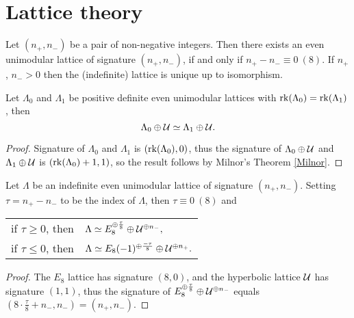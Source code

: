 \section{Lattice theory}

\begin{theorem}[Milnor]
    \label{Milnor}
    Let $(n_+,n_-)$ be a pair of non-negative integers. Then there exists an even unimodular lattice of signature $(n_+, n_-)$, if and only if $n_+ - n_- \equiv 0 \ (8)$. If $n_+$, $n_- > 0$ then the (indefinite) lattice is unique up to isomorphism.
\end{theorem}

\begin{corollary}
    Let $\Lambda_0$ and $\Lambda_1$ be positive definite even unimodular lattices with $\operatorname{rk}(\Lambda_0) = \operatorname{rk}(\Lambda_1)$, then
    \[
        \Lambda_0 \oplus \mathcal U \simeq \Lambda_1 \oplus \mathcal U.
    \]
\end{corollary}

\begin{proof}
    Signature of $\Lambda_0$ and $\Lambda_1$ is $(\operatorname{rk}(\Lambda_0), 0)$, thus the signature of $\Lambda_0 \oplus \mathcal U$ and $\Lambda_1 \oplus \mathcal U$ is $(\operatorname{rk}(\Lambda_0) + 1, 1)$, so the result follows by Milnor's Theorem \ref{Milnor}.
\end{proof}

\begin{corollary}
    Let $\Lambda$ be an indefinite even unimodular lattice of signature $(n_+, n_-)$. Setting $\tau = n_+ - n_-$ to be the index of $\Lambda$, then $\tau \equiv 0 \ (8)$ and
    \begin{center}
        \begin{tabular}{r l}
            if $\tau \geq 0$, then & $\Lambda \simeq E_8^{\oplus \frac{\tau}{8}} \oplus \mathcal U^{\oplus n_-},$ \\
            if $\tau \leq 0$, then & $\Lambda \simeq E_8(-1)^{\oplus \frac{-\tau}{8}} \oplus \mathcal U^{\oplus n_+}.$
        \end{tabular}
    \end{center}
\end{corollary}

\begin{proof}
    The $E_8$ lattice has signature $(8,0)$, and the hyperbolic lattice $\mathcal U$ has signature $(1,1)$, thus the signature of $E_8^{\oplus \frac{\tau}{8}} \oplus \mathcal U^{\oplus n_-}$ equals $(8\cdot \tfrac{\tau}{8} + n_-,n_-) = (n_+, n_-)$.
\end{proof}

